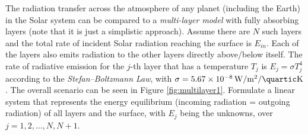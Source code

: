 \begin{exmp}
\label{exmp:multilayer1}
The radiation transfer across the atmosphere of any planet (including the Earth) in the Solar system can be compared to a \textit{multi-layer model} with fully absorbing layers (note that it is just a simplistic approach). Assume there are $N$ such layers and the total rate of incident Solar radiation reaching the surface is $E_{in}$. Each of the layers also emits radiation to the other layers directly above/below itself. The rate of radiative emission for the $j$-th layer that has a temperature $T_j$ is $E_j = \sigma T_j^4$ according to the \textit{Stefan–Boltzmann Law}, with $\sigma = \SI{5.67e-8}{\W \per \square\m \per \quartic\K}$. The overall scenario can be seen in Figure \ref{fig:multilayer1}. Formulate a linear system that represents the energy equilibrium (incoming radiation = outgoing radiation) of all layers and the surface, with $E_j$ being the unknowns, over $j = 1, 2, \ldots, N, N+1$.
\end{exmp}
